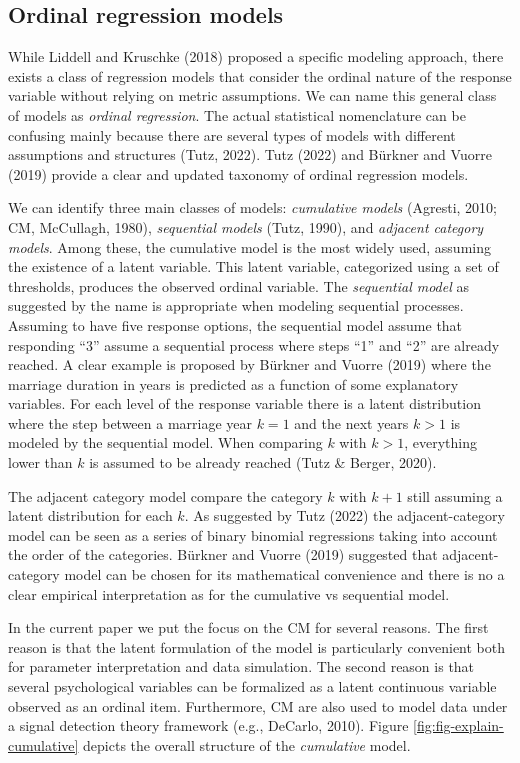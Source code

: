 \documentclass[
  man, mask,floatsintext]{apa6}
\begin{document}
\subsection{Ordinal regression models}\label{ordinal-regression-models}

While Liddell and Kruschke (2018) proposed a specific modeling approach, there exists a class of regression models that consider the ordinal nature of the response variable without relying on metric assumptions. We can name this general class of models as \emph{ordinal regression}. The actual statistical nomenclature can be confusing mainly because there are several types of models with different assumptions and structures (Tutz, 2022). Tutz (2022) and Bürkner and Vuorre (2019) provide a clear and updated taxonomy of ordinal regression models.

We can identify three main classes of models: \emph{cumulative models} (Agresti, 2010; CM, McCullagh, 1980), \emph{sequential models} (Tutz, 1990), and \emph{adjacent category models}. Among these, the cumulative model is the most widely used, assuming the existence of a latent variable. This latent variable, categorized using a set of thresholds, produces the observed ordinal variable. The \emph{sequential model} as suggested by the name is appropriate when modeling sequential processes. Assuming to have five response options, the sequential model assume that responding ``3'' assume a sequential process where steps ``1'' and ``2'' are already reached. A clear example is proposed by Bürkner and Vuorre (2019) where the marriage duration in years is predicted as a function of some explanatory variables. For each level of the response variable there is a latent distribution where the step between a marriage year \(k = 1\) and the next years \(k > 1\) is modeled by the sequential model. When comparing \(k\) with \(k > 1\), everything lower than \(k\) is assumed to be already reached (Tutz \& Berger, 2020).

The adjacent category model compare the category \(k\) with \(k + 1\) still assuming a latent distribution for each \(k\). As suggested by Tutz (2022) the adjacent-category model can be seen as a series of binary binomial regressions taking into account the order of the categories. Bürkner and Vuorre (2019) suggested that adjacent-category model can be chosen for its mathematical convenience and there is no a clear empirical interpretation as for the cumulative vs sequential model.

In the current paper we put the focus on the CM for several reasons. The first reason is that the latent formulation of the model is particularly convenient both for parameter interpretation and data simulation. The second reason is that several psychological variables can be formalized as a latent continuous variable observed as an ordinal item. Furthermore, CM are also used to model data under a signal detection theory framework (e.g., DeCarlo, 2010). Figure \ref{fig:fig-explain-cumulative} depicts the overall structure of the \emph{cumulative} model.
\end{document}
